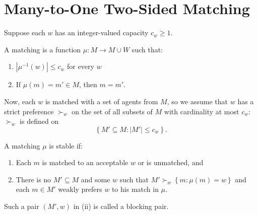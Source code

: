 \section{Many-to-One Two-Sided Matching}

Suppose each $w$ has an integer-valued capacity $c_w \ge 1$.

\begin{definition}[Matching]
	A matching is a function $\mu: M \to M \cup W$ such that:
	\begin{enumerate}[label = (\roman*)]
		\item $\left| \mu^{-1}(w) \right| \le c_w$ for every $w$ 
		\item If $\mu(m) = m' \in M$, then $m = m'$.
	\end{enumerate}
\end{definition}

Now, each $w$ is matched with a set of agents from $M$, so we assume that $w$ has a strict preference $\succ_w$ on the set of all subsets of $M$ with cardinality at most $c_w$: $\succ_w$ is defined on \[
	\left\{M' \subseteq M : \left| M' \right| \le c_w\right\}
.\] 

\begin{definition}
	A matching $\mu$ is stable if:
	\begin{enumerate}[label = (\roman*)]
		\item Each $m$ is matched to an acceptable $w$ or is unmatched, and 
		\item There is no $M' \subseteq M$ and some $w$ such that $M' \succ_w \left\{m: \mu(m) = w\right\}$ and each $m \in M'$ weakly prefers $w$ to his match in $\mu$.
	\end{enumerate}
	Such a pair $(M',w)$ in (ii) is called a blocking pair.
\end{definition}

